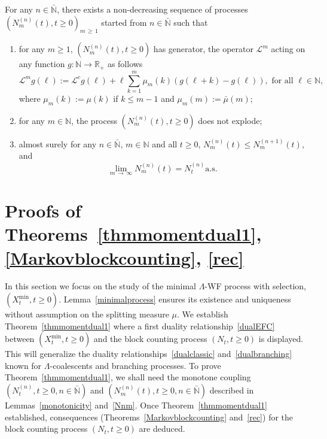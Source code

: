 \documentclass[AHL,Unicode,longabstracts,published]{cedram}
\newcommand{\bbN}{\mathbb{N}}
\newcommand{\bbR}{\mathbb{R}}
\newcommand{\clL}{\mathcal{L}}
\newcommand*{\romanenumi}{\renewcommand*{\theenumi}{\roman{enumi}}}
\begin{document}
\begin{lemm} \label{Nnm}
For any $n\in \bar{\bbN}$, there exists a non-decreasing sequence of processes $(N^{(n)}_m(t),t\geq 0)_{m\,\geq\,1}$ started from $n\in \bar{\bbN}$ such that
\begin{enumerate}\romanenumi
\item\label{lemm3.11.i} for any $m\geq 1$, $(N^{(n)}_m(t),t\geq 0)$ has generator, the operator $\clL^{m}$ acting on any function $g: \bbN\rightarrow \bbR_+$ as follows
\begin{equation}\label{genNm}
\clL^{m}g(\ell):=\clL^{c}g(\ell)+\ell\sum_{k=1}^{m}\mu_{m}(k)(g(\ell+k)-g(\ell)), \text{ for all } \ell \in \bbN,
\end{equation}
where $\mu_{m}(k):=\mu(k)$ if $k\leq m-1$ and $\mu_m(m):=\bar{\mu}(m)$;
\item\label{lemm3.11.ii} for any $m\in \bbN$, the process $(N_m^{(n)}(t),t\geq 0)$ does not explode;
\item\label{lemm3.11.iii} almost surely for any $n\in \bar{\bbN}$, $m\in \bbN$ and all $t\geq 0$, $N^{(n)}_{m}(t)\leq N^{(n+1)}_{m}(t)$,
and
\[
\underset{m\,\rightarrow\,\infty}{\lim} N^{(n)}_m(t)=N^{(n)}_t \text{a.s.}
\]
\end{enumerate}
\end{lemm}


\section{Proofs of Theorems~\ref{thmmomentdual1}, \ref{Markovblockcounting}, \ref{rec}}\label{sec1}



In this section we focus on the study of the minimal $\Lambda$-WF process with selection, $(X_t^{\min},t\geq 0)$. Lemma~\ref{minimalprocess} ensures its existence and uniqueness without assumption on the splitting measure $\mu$. We establish Theorem~\ref{thmmomentdual1} where a first duality relationship~\eqref{dualEFC} between $(X_t^{\min},t\geq 0)$ and the block counting process $(N_t,t\geq 0)$ is displayed. This will generalize the duality relationships~\eqref{dualclassic} and~\eqref{dualbranching} known for $\Lambda$-coalescents and branching processes. To prove Theorem~\ref{thmmomentdual1}, we shall need the monotone coupling $(N_t^{(n)},t\geq 0, n\in \bar{\bbN})$ and $(N_m^{(n)}(t),t\geq 0, n\in \bar{\bbN})$ described in Lemmas~\ref{monotonicity} and~\ref{Nnm}. Once Theorem~\ref{thmmomentdual1} established, consequences (Theorems~\ref{Markovblockcounting} and~\ref{rec}) for the block counting process $(N_t,t\geq 0)$ are deduced.
\end{document}
